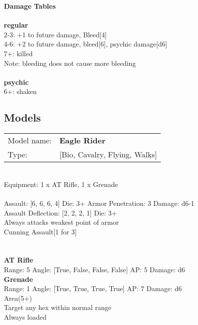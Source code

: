 {\bf Damage Tables} \\
\ \\ {\bf regular } \\
2-3: +1 to future damage, Bleed[4] \\
4-6: +2 to future damage, bleed[6], psychic damage[d6] \\
7+: killed \\
Note: bleeding does not cause more bleeding \\
\ \\ {\bf psychic } \\
6+: shaken \\


\pagebreak

\subsection{ Models }

\begin{tabular}{ll}
Model name: & {\bf Eagle Rider } \\
Type: & [Bio, Cavalry, Flying, Walks] \\
\end{tabular}
\ \\
Equipment: 1 x AT Rifle, 1 x Grenade \\
\ \\
Assault: [6, 6, 6, 4] Die: 3+ Armor Penetration: 3 Damage: d6-1 \\
Assault Deflection: [2, 2, 2, 1] Die: 3+\\
\indent Always attacks weakest point of armor\\ 
Cunning Assault[1 for 3]\\ 
 
\ \\

\ \\
{\bf AT Rifle } \\



Range: 5  Angle: [True, False, False, False] AP: 5 Damage: d6 \\




{\bf Grenade } \\



Range: 1  Angle: [True, True, True, True] AP: 7 Damage: d6 \\
Area(5+)\\ 
Target any hex within normal range\\ 
Always loaded\\ 




